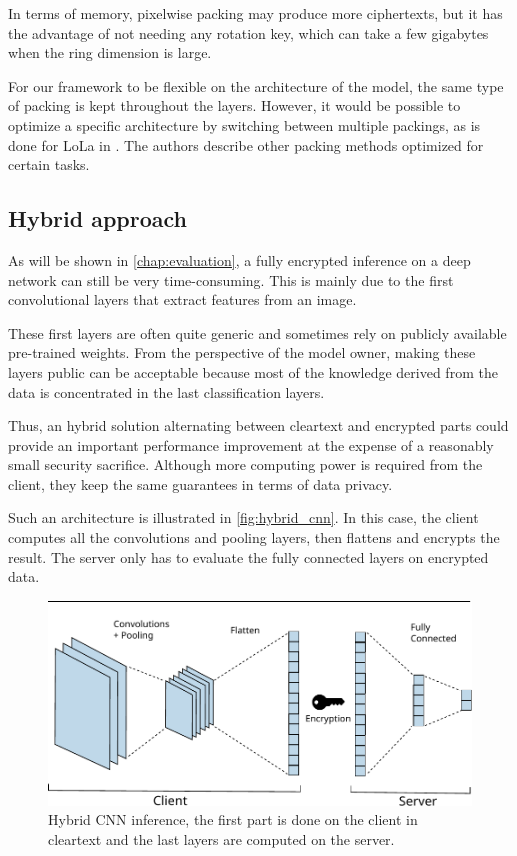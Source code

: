 \documentclass[a4paper,11pt,oneside]{report}
\begin{document}
In terms of memory, pixelwise packing may produce more ciphertexts, but it has the advantage of not needing any rotation key, which can take a few gigabytes when the ring dimension is large.

For our framework to be flexible on the architecture of the model, the same type of packing is kept throughout the layers. 
However, it would be possible to optimize a specific architecture by switching between multiple packings, as is done for LoLa in \cite{brutzkus_low_2019}. 
The authors describe other packing methods optimized for certain tasks.

\subsection{Hybrid approach}\label{sec:hybrid_cnn}

As will be shown in \autoref{chap:evaluation}, a fully encrypted inference on a deep network can still be very time-consuming.
This is mainly due to the first convolutional layers that extract features from an image.

These first layers are often quite generic and sometimes rely on publicly available pre-trained weights.
From the perspective of the model owner, making these layers public can be acceptable because most of the knowledge derived from the data is concentrated in the last classification layers.

Thus, an hybrid solution alternating between cleartext and encrypted parts could provide an important performance improvement at the expense of a reasonably small security sacrifice.
Although more computing power is required from the client, they keep the same guarantees in terms of data privacy.

Such an architecture is illustrated in \autoref{fig:hybrid_cnn}.
In this case, the client computes all the convolutions and pooling layers, then flattens and encrypts the result. 
The server only has to evaluate the fully connected layers on encrypted data.

\begin{figure}[h]
  \centering
  \includegraphics[width=\textwidth]{figures/layers.pdf}
  \caption{Hybrid CNN inference, the first part is done on the client in cleartext and the last layers are computed on the server.}
  \label{fig:hybrid_cnn}
\end{figure}
\end{document}
